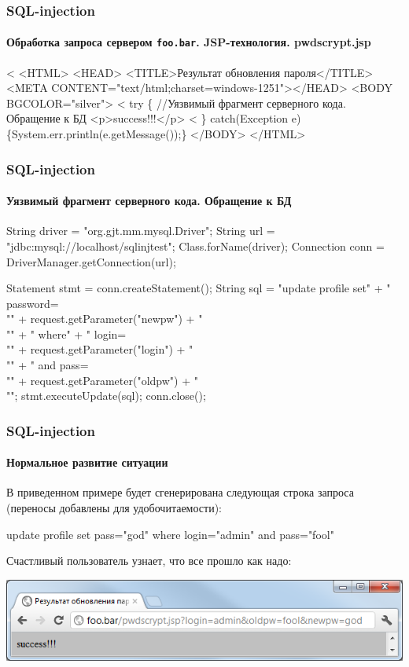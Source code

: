 \begin{frame}[fragile]
    \frametitle{SQL-injection}
    \framesubtitle{Обработка запроса сервером \verb"foo.bar". JSP-технология. pwdscrypt.jsp}
        
    \begin{semiverbatim}
<%
<HTML> 
  <HEAD> <TITLE>Результат обновления пароля</TITLE>
    <META CONTENT="text/html;charset=windows-1251"></HEAD>
  <BODY BGCOLOR="silver">
<%
\alert<2>{try \{ //Уязвимый фрагмент серверного кода. Обращение к БД
}%
    <p>success!!!</p>
<%
\alert<2>{\} catch(Exception e) \{System.err.println(e.getMessage());\}}
  </BODY>
</HTML>
    \end{semiverbatim}
\end{frame}


\begin{frame}[fragile]
    \frametitle{SQL-injection}
    \framesubtitle{Уязвимый фрагмент серверного кода. Обращение к БД}
    
    \begin{semiverbatim}
String driver = "org.gjt.mm.mysql.Driver";
String url    = "jdbc:mysql://localhost/sqlinjtest";
Class.forName(driver);
Connection conn = DriverManager.getConnection(url);

Statement stmt = conn.createStatement();
\alert<2>{String    sql  = 
    "update profile set"
    + " password=\\"" + request.getParameter("newpw") + "\\""
    + " where"
    + " login=\\""    + request.getParameter("login") + "\\""
    + " and pass=\\"" + request.getParameter("oldpw") + "\\"";}
stmt.executeUpdate(\alert<2>{sql});
conn.close();
    \end{semiverbatim}
\end{frame}

\begin{frame}[fragile]
    \frametitle{SQL-injection}
    \framesubtitle{Нормальное развитие ситуации}
    
    В приведенном примере будет сгенерирована следующая строка запроса (переносы добавлены для удобочитаемости):
    \begin{semiverbatim}
update profile set pass="god" 
  where login="admin" and pass="fool"
    \end{semiverbatim}
    Счастливый пользователь узнает, что все прошло как надо:
    
    \includegraphics[width=\textwidth]{fig/htmrespok.png}
\end{frame}

